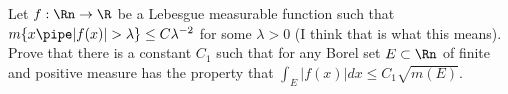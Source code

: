 Let $f:\Rn\rightarrow \R$ be a Lebesgue measurable function such that
$m\{x \pipe |f(x)|>\lambda\} \leq C\lambda^{-2}$ for some $\lambda>0$
(I think that is what this means). Prove that there is a constant
$C_1$ such that for any Borel set $E\subset \Rn$ of finite and
positive measure has the property that $\int_E|f(x)|dx \leq C_1
\sqrt{m(E)}$.
